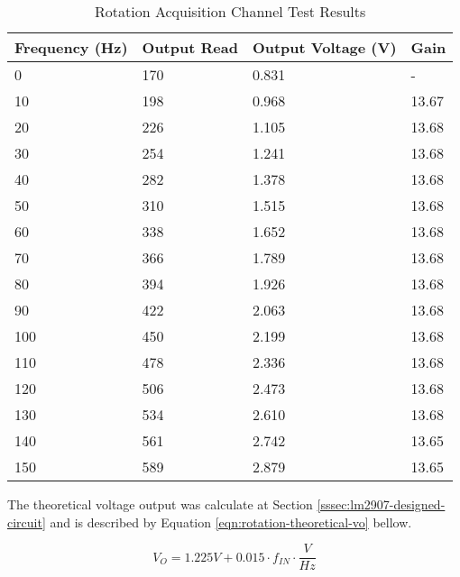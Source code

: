 			\begin{table}[h!]
				\begin{tabular}{|l|l|l|l|}
					\hline
					\textbf{Frequency (Hz)} & \textbf{Output Read} & \textbf{Output Voltage (V)} & \textbf{Gain} \\ \hline
					0 & 170 & 0.831 & - \\ \hline
					10 & 198 & 0.968 & 13.67 \\ \hline
					20 & 226 & 1.105 & 13.68 \\ \hline
					30 & 254 & 1.241 & 13.68 \\ \hline
					40 & 282 & 1.378 & 13.68 \\ \hline
					50 & 310 & 1.515 & 13.68 \\ \hline
					60 & 338 & 1.652 & 13.68 \\ \hline
					70 & 366 & 1.789 & 13.68 \\ \hline
					80 & 394 & 1.926 & 13.68 \\ \hline
					90 & 422 & 2.063 & 13.68 \\ \hline
					100 & 450 & 2.199 & 13.68 \\ \hline
					110 & 478 & 2.336 & 13.68 \\ \hline
					120 & 506 & 2.473 & 13.68 \\ \hline
					130 & 534 & 2.610 & 13.68 \\ \hline
					140 & 561 & 2.742 & 13.65 \\ \hline
					150 & 589 & 2.879 & 13.65 \\ \hline
				\end{tabular}
				\caption{Rotation Acquisition Channel Test Results}
				\label{table:results-rotation-test}
			\end{table}

		The theoretical voltage output was calculate at Section \ref{sssec:lm2907-designed-circuit} and is described by Equation \ref{eqn:rotation-theoretical-vo} bellow.

			\begin{equation}\label{eqn:rotation-theoretical-vo}
				V_{O}=1.225V + 0.015 \cdot f_{IN}  \cdot \frac{V}{Hz}
			\end{equation}

